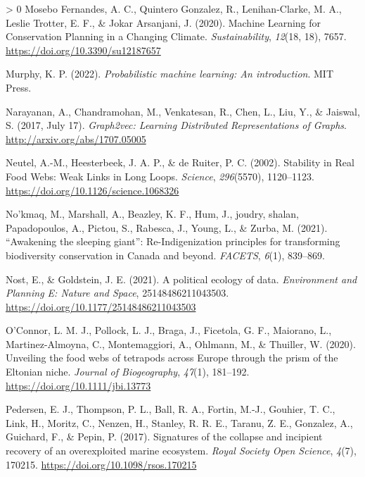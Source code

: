 \documentclass[11pt]{article}
\newlength{\cslhangindent}
\newenvironment{CSLReferences}[3] %
 {%
  \setlength{\parindent}{0pt}
  \ifodd #1 \everypar{\setlength{\hangindent}{\cslhangindent}}\ignorespaces\fi
  \ifnum #2 > 0
  \setlength{\parskip}{#2\baselineskip}
  \fi
 }%
 {}
\begin{document}
\begin{CSLReferences}{1}{0}
\leavevmode\hypertarget{ref-MoseboFernandes2020MacLea}{}%
Mosebo Fernandes, A. C., Quintero Gonzalez, R., Lenihan-Clarke, M. A.,
Leslie Trotter, E. F., \& Jokar Arsanjani, J. (2020). Machine Learning
for Conservation Planning in a Changing Climate. \emph{Sustainability},
\emph{12}(18, 18), 7657. \url{https://doi.org/10.3390/su12187657}

\leavevmode\hypertarget{ref-Murphy2022ProMac}{}%
Murphy, K. P. (2022). \emph{Probabilistic machine learning: An
introduction}. MIT Press.

\leavevmode\hypertarget{ref-Narayanan2017GraLea}{}%
Narayanan, A., Chandramohan, M., Venkatesan, R., Chen, L., Liu, Y., \&
Jaiswal, S. (2017, July 17). \emph{Graph2vec: Learning Distributed
Representations of Graphs}. \url{http://arxiv.org/abs/1707.05005}

\leavevmode\hypertarget{ref-Neutel2002StaRea}{}%
Neutel, A.-M., Heesterbeek, J. A. P., \& de Ruiter, P. C. (2002).
Stability in Real Food Webs: Weak Links in Long Loops. \emph{Science},
\emph{296}(5570), 1120--1123.
\url{https://doi.org/10.1126/science.1068326}

\leavevmode\hypertarget{ref-Nokmaq2021AwaSle}{}%
No'kmaq, M., Marshall, A., Beazley, K. F., Hum, J., joudry, shalan,
Papadopoulos, A., Pictou, S., Rabesca, J., Young, L., \& Zurba, M.
(2021). {``Awakening the sleeping giant''}: Re-Indigenization principles
for transforming biodiversity conservation in Canada and beyond.
\emph{FACETS}, \emph{6}(1), 839--869.

\leavevmode\hypertarget{ref-Nost2021PolEco}{}%
Nost, E., \& Goldstein, J. E. (2021). A political ecology of data.
\emph{Environment and Planning E: Nature and Space}, 25148486211043503.
\url{https://doi.org/10.1177/25148486211043503}

\leavevmode\hypertarget{ref-OConnor2020UnvFoo}{}%
O'Connor, L. M. J., Pollock, L. J., Braga, J., Ficetola, G. F.,
Maiorano, L., Martinez-Almoyna, C., Montemaggiori, A., Ohlmann, M., \&
Thuiller, W. (2020). Unveiling the food webs of tetrapods across Europe
through the prism of the Eltonian niche. \emph{Journal of Biogeography},
\emph{47}(1), 181--192. \url{https://doi.org/10.1111/jbi.13773}

\leavevmode\hypertarget{ref-Pedersen2017SigCol}{}%
Pedersen, E. J., Thompson, P. L., Ball, R. A., Fortin, M.-J., Gouhier,
T. C., Link, H., Moritz, C., Nenzen, H., Stanley, R. R. E., Taranu, Z.
E., Gonzalez, A., Guichard, F., \& Pepin, P. (2017). Signatures of the
collapse and incipient recovery of an overexploited marine ecosystem.
\emph{Royal Society Open Science}, \emph{4}(7), 170215.
\url{https://doi.org/10.1098/rsos.170215}


\end{CSLReferences}
\end{document}
